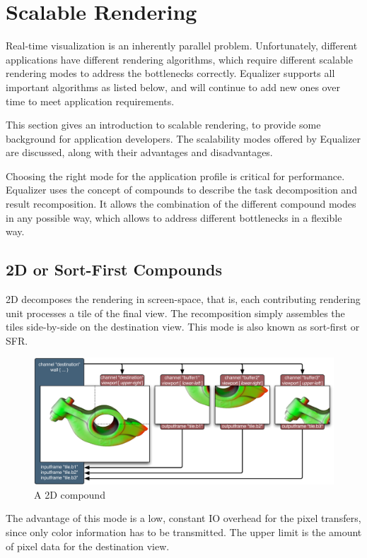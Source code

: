 \documentclass[10pt,a4]{scrartcl}
\begin{document}
\section{Scalable Rendering}

Real-time visualization is an inherently parallel
problem. Unfortunately, different applications have different rendering
algorithms, which require different scalable rendering modes to address
the bottlenecks correctly. Equalizer supports all important algorithms as
listed below, and will continue to add new ones over time to meet
application requirements.

This section gives an introduction to scalable rendering, to
provide some background for application developers. The scalability
modes offered by Equalizer are discussed, along with their advantages
and disadvantages. 

Choosing the right mode for the application profile is critical for
performance. Equalizer uses the concept of compounds to describe the
task decomposition and result recomposition. It allows the combination
of the different compound modes in any possible way, which allows to
address different bottlenecks in a flexible way.


\subsection{2D or Sort-First Compounds}

2D decomposes the rendering in screen-space, that is, each contributing
rendering unit processes a tile of the final view. The recomposition
simply assembles the tiles side-by-side on the destination view. This
mode is also known as sort-first or SFR.

\begin{figure}
  \includegraphics[width=.618\textwidth]{images/2D.pdf}
  {\caption{ A 2D compound}}
\end{figure}
The advantage of this mode is a low, constant IO overhead for the pixel
transfers, since only color information has to be transmitted. The upper
limit is the amount of pixel data for the destination view.
\end{document}
